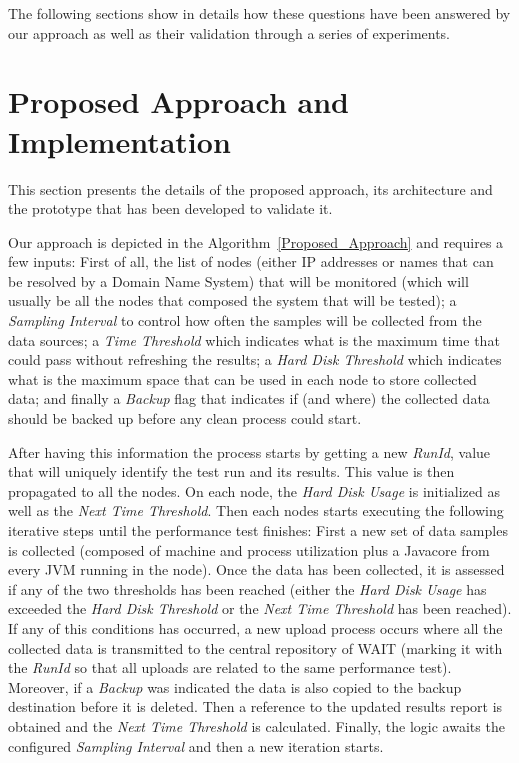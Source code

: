 \documentclass[runningheads,a4paper]{llncs}
\begin{document}
The following sections show in details how these questions have been answered by
our approach as well as their validation through a series of experiments.


\section{Proposed Approach and Implementation}

This section presents the details of the proposed approach, its architecture
and the prototype that has been developed to validate it.

Our approach is depicted in the Algorithm~\ref{Proposed_Approach} and requires
a few inputs: First of all, the list of nodes (either IP addresses or names that
can be resolved by a Domain Name System) that will be monitored (which
will usually be all the nodes that composed the system that will be tested); a
\emph{Sampling Interval} to control how often the samples will be collected
from the data sources; a \emph{Time Threshold} which indicates what is the
maximum time that could pass without refreshing the results; a \emph{Hard Disk
Threshold} which indicates what is the maximum space that can be used in each
node to store collected data; and finally a \emph{Backup} flag that indicates if
(and where) the collected data should be backed up before any clean process could start.

After having this information the process starts by getting a new \emph{RunId},
value that will uniquely identify the test run and its results. This value is
then propagated to all the nodes. On each node, the \emph{Hard Disk Usage} is
initialized as well as the \emph{Next Time Threshold}. Then each nodes starts
executing the following iterative steps until the performance test finishes:
First a new set of data samples is collected (composed of machine and process
utilization plus a Javacore from every JVM running in the node). Once the data 
has been collected, it is assessed if any of the two thresholds has been reached 
(either the \emph{Hard Disk Usage} has exceeded the \emph{Hard Disk
Threshold} or the \emph{Next Time Threshold} has been reached). If any of this
conditions has occurred, a new upload process occurs where all the collected
data is transmitted to the central repository of WAIT (marking it with the
\emph{RunId} so that all uploads are related to the same performance test).
Moreover, if a \emph{Backup} was indicated the data is also copied to the
backup destination before it is deleted. Then a reference to the updated results
report is obtained and the \emph{Next Time Threshold} is calculated. Finally,
the logic awaits the configured \emph{Sampling Interval} and then a new iteration starts.
\end{document}
